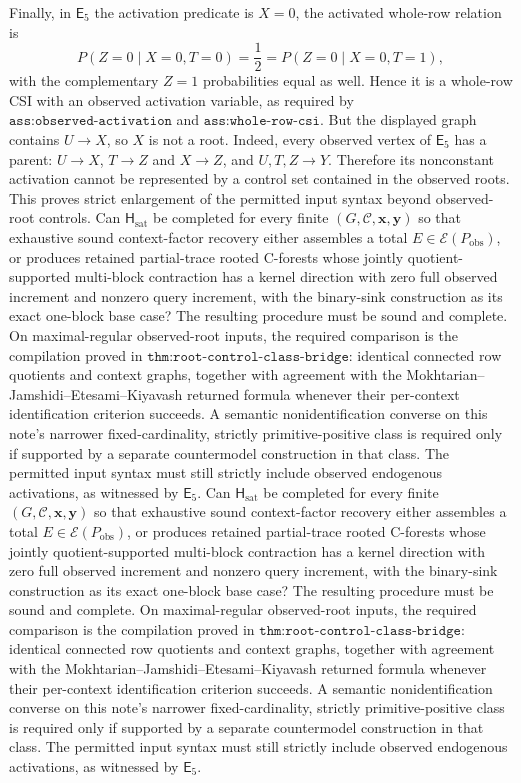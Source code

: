 Finally, in \(\mathsf E_5\) the activation predicate is \(X=0\), the activated whole-row relation is
\[
P(Z=0\mid X=0,T=0)=\frac12
=P(Z=0\mid X=0,T=1),
\]
with the complementary \(Z=1\) probabilities equal as well. Hence it is a whole-row CSI with an observed activation variable, as required by \(\texttt{ass:observed-activation}\) and \(\texttt{ass:whole-row-csi}\). But the displayed graph contains \(U\to X\), so \(X\) is not a root. Indeed, every observed vertex of \(\mathsf E_5\) has a parent: \(U\to X\), \(T\to Z\) and \(X\to Z\), and \(U,T,Z\to Y\). Therefore its nonconstant activation cannot be represented by a control set contained in the observed roots. This proves strict enlargement of the permitted input syntax beyond observed-root controls.
Can \(\mathsf H_{\mathrm{sat}}\) be completed for every finite \((G,\mathcal C,\mathbf x,\mathbf y)\) so that exhaustive sound context-factor recovery either assembles a total \(E\in\mathscr E(P_{\mathrm{obs}})\), or produces retained partial-trace rooted C-forests whose jointly quotient-supported multi-block contraction has a kernel direction with zero full observed increment and nonzero query increment, with the binary-sink construction as its exact one-block base case? The resulting procedure must be sound and complete. On maximal-regular observed-root inputs, the required comparison is the compilation proved in \(\texttt{thm:root-control-class-bridge}\): identical connected row quotients and context graphs, together with agreement with the Mokhtarian--Jamshidi--Etesami--Kiyavash returned formula whenever their per-context identification criterion succeeds. A semantic nonidentification converse on this note's narrower fixed-cardinality, strictly primitive-positive class is required only if supported by a separate countermodel construction in that class. The permitted input syntax must still strictly include observed endogenous activations, as witnessed by \(\mathsf E_5\).
Can \(\mathsf H_{\mathrm{sat}}\) be completed for every finite \((G,\mathcal C,\mathbf x,\mathbf y)\) so that exhaustive sound context-factor recovery either assembles a total \(E\in\mathscr E(P_{\mathrm{obs}})\), or produces retained partial-trace rooted C-forests whose jointly quotient-supported multi-block contraction has a kernel direction with zero full observed increment and nonzero query increment, with the binary-sink construction as its exact one-block base case? The resulting procedure must be sound and complete. On maximal-regular observed-root inputs, the required comparison is the compilation proved in \(\texttt{thm:root-control-class-bridge}\): identical connected row quotients and context graphs, together with agreement with the Mokhtarian--Jamshidi--Etesami--Kiyavash returned formula whenever their per-context identification criterion succeeds. A semantic nonidentification converse on this note's narrower fixed-cardinality, strictly primitive-positive class is required only if supported by a separate countermodel construction in that class. The permitted input syntax must still strictly include observed endogenous activations, as witnessed by \(\mathsf E_5\).

